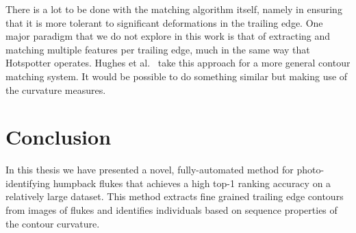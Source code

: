 There is a lot to be done with the matching algorithm itself, namely in ensuring that it is more tolerant to significant deformations in the trailing edge.
One major paradigm that we do not explore in this work is that of extracting and matching multiple features per trailing edge, much in the same way that Hotspotter operates.
Hughes et al.\ \cite{hughes2015automated} take this approach for a more general contour matching system.
It would be possible to do something similar but making use of the curvature measures.


\section{Conclusion}

In this thesis we have presented a novel, fully-automated method for photo-identifying humpback flukes that achieves a high top-1 ranking accuracy on a relatively large dataset.
This method extracts fine grained trailing edge contours from images of flukes and identifies individuals based on sequence properties of the contour curvature.

